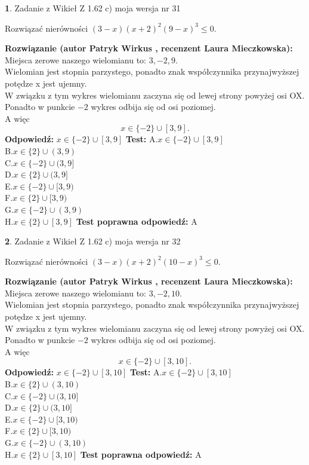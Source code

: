 \documentclass[12pt, a4paper]{article}
\theoremstyle{definition} %
\newtheorem{zad}{}
\newcommand{\zadStart}[1]{\begin{zad}#1\newline}
\newcommand{\zadStop}{\end{zad}}
\newcommand{\rozwStart}[2]{\noindent \textbf{Rozwiązanie (autor #1 , recenzent #2): }\newline}
\newcommand{\rozwStop}{\newline}
\newcommand{\odpStart}{\noindent \textbf{Odpowiedź:}\newline}
\newcommand{\odpStop}{\newline}
\newcommand{\testStart}{\noindent \textbf{Test:}\newline}
\newcommand{\testStop}{\newline}
\newcommand{\kluczStart}{\noindent \textbf{Test poprawna odpowiedź:}\newline}
\newcommand{\kluczStop}{\newline}
\begin{document}
\zadStart{Zadanie z Wikieł Z 1.62 c) moja wersja nr 31}

Rozwiązać nierówności $(3-x)(x+2)^{2}(9-x)^{3}\le0$.
\zadStop
\rozwStart{Patryk Wirkus}{Laura Mieczkowska}
Miejsca zerowe naszego wielomianu to: $3, -2, 9$.\\
Wielomian jest stopnia parzystego, ponadto znak współczynnika przy\linebreak najwyższej potędze x jest ujemny.\\ W związku z tym wykres wielomianu zaczyna się od lewej strony powyżej osi OX.\\
Ponadto w punkcie $-2$ wykres odbija się od osi poziomej.\\
A więc $$x \in \{-2\} \cup [3,9].$$
\rozwStop
\odpStart
$x \in \{-2\} \cup [3,9]$
\odpStop
\testStart
A.$x \in \{-2\} \cup [3,9]$\\
B.$x \in \{2\} \cup (3,9)$\\
C.$x \in \{-2\} \cup (3,9]$\\
D.$x \in \{2\} \cup (3,9]$\\
E.$x \in \{-2\} \cup [3,9)$\\
F.$x \in \{2\} \cup [3,9)$\\
G.$x \in \{-2\} \cup (3,9)$\\
H.$x \in \{2\} \cup [3,9]$
\testStop
\kluczStart
A
\kluczStop



\zadStart{Zadanie z Wikieł Z 1.62 c) moja wersja nr 32}

Rozwiązać nierówności $(3-x)(x+2)^{2}(10-x)^{3}\le0$.
\zadStop
\rozwStart{Patryk Wirkus}{Laura Mieczkowska}
Miejsca zerowe naszego wielomianu to: $3, -2, 10$.\\
Wielomian jest stopnia parzystego, ponadto znak współczynnika przy\linebreak najwyższej potędze x jest ujemny.\\ W związku z tym wykres wielomianu zaczyna się od lewej strony powyżej osi OX.\\
Ponadto w punkcie $-2$ wykres odbija się od osi poziomej.\\
A więc $$x \in \{-2\} \cup [3,10].$$
\rozwStop
\odpStart
$x \in \{-2\} \cup [3,10]$
\odpStop
\testStart
A.$x \in \{-2\} \cup [3,10]$\\
B.$x \in \{2\} \cup (3,10)$\\
C.$x \in \{-2\} \cup (3,10]$\\
D.$x \in \{2\} \cup (3,10]$\\
E.$x \in \{-2\} \cup [3,10)$\\
F.$x \in \{2\} \cup [3,10)$\\
G.$x \in \{-2\} \cup (3,10)$\\
H.$x \in \{2\} \cup [3,10]$
\testStop
\kluczStart
A
\kluczStop
\end{document}
